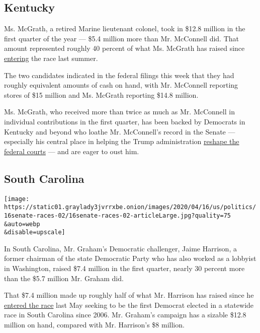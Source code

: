 \hypertarget{kentucky}{%
\subsection{Kentucky}\label{kentucky}}

Ms. McGrath, a retired Marine lieutenant colonel, took in \$12.8 million
in the first quarter of the year --- \$5.4 million more than Mr.
McConnell did. That amount represented roughly 40 percent of what Ms.
McGrath has raised since
\href{https://www.nytimes3xbfgragh.onion/2019/07/09/us/politics/amy-mcgrath-2020-senate.html}{entering}
the race last summer.

The two candidates indicated in the federal filings this week that they
had roughly equivalent amounts of cash on hand, with Mr. McConnell
reporting stores of \$15 million and Ms. McGrath reporting \$14.8
million.

Ms. McGrath, who received more than twice as much as Mr. McConnell in
individual contributions in the first quarter, has been backed by
Democrats in Kentucky and beyond who loathe Mr. McConnell's record in
the Senate --- especially his central place in helping the Trump
administration
\href{https://www.nytimes3xbfgragh.onion/2020/03/14/us/trump-appeals-court-judges.html}{reshape
the federal courts} --- and are eager to oust him.

\hypertarget{south-carolina}{%
\subsection{South Carolina}\label{south-carolina}}

\texttt{[image: https://static01.graylady3jvrrxbe.onion/images/2020/04/16/us/politics/16senate-races-02/16senate-races-02-articleLarge.jpg?quality=75\\\&auto=webp\\\&disable=upscale]}

In South Carolina, Mr. Graham's Democratic challenger, Jaime Harrison, a
former chairman of the state Democratic Party who has also worked as a
lobbyist in Washington, raised \$7.4 million in the first quarter,
nearly 30 percent more than the \$5.7 million Mr. Graham did.

That \$7.4 million made up roughly half of what Mr. Harrison has raised
since he
\href{https://www.nytimes3xbfgragh.onion/2019/05/29/us/politics/jaime-harrison-lindsey-graham.html}{entered
the race} last May seeking to be the first Democrat elected in a
statewide race in South Carolina since 2006. Mr. Graham's campaign has a
sizable \$12.8 million on hand, compared with Mr. Harrison's \$8
million.

